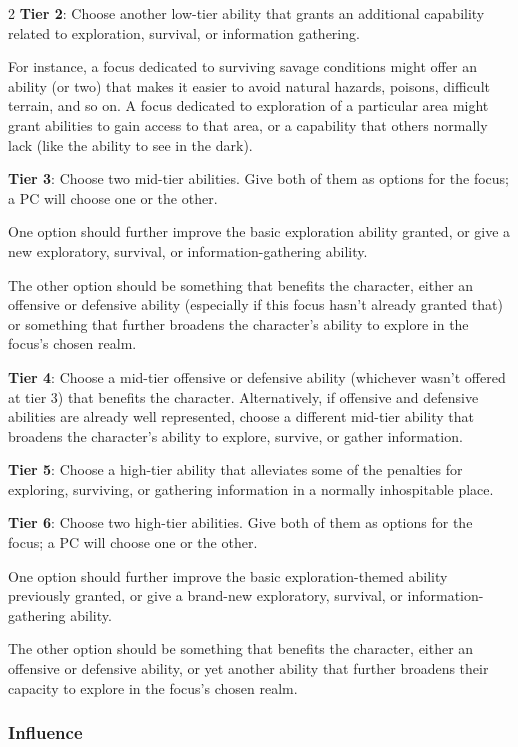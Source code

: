 \begin{multicols}{2}
\textbf{Tier 2}: Choose another low-tier ability that grants an additional capability related to exploration, survival, or information gathering.

For instance, a focus dedicated to surviving savage conditions might offer an ability (or two) that makes it easier to avoid natural hazards, poisons, difficult terrain, and so on. A focus dedicated to exploration of a particular area might grant abilities to gain access to that area, or a capability that others normally lack (like the ability to see in the dark).

\textbf{Tier 3}: Choose two mid-tier abilities. Give both of them as options for the focus; a PC will choose one or the other.

One option should further improve the basic exploration ability granted, or give a new exploratory, survival, or information-gathering ability.

The other option should be something that benefits the character, either an offensive or defensive ability (especially if this focus hasn’t already granted that) or something that further broadens the character’s ability to explore in the focus’s chosen realm. 

\textbf{Tier 4}: Choose a mid-tier offensive or defensive ability (whichever wasn’t offered at tier 3) that benefits the character. Alternatively, if offensive and defensive abilities are already well represented, choose a different mid-tier ability that broadens the character’s ability to explore, survive, or gather information.

\textbf{Tier 5}: Choose a high-tier ability that alleviates some of the penalties for exploring, surviving, or gathering information in a normally inhospitable place.

\textbf{Tier 6}: Choose two high-tier abilities. Give both of them as options for the focus; a PC will choose one or the other.

One option should further improve the basic exploration-themed ability previously granted, or give a brand-new exploratory, survival, or information-gathering ability.

The other option should be something that benefits the character, either an offensive or defensive ability, or yet another ability that further broadens their capacity to explore in the focus’s chosen realm. 

\subsubsection{Influence}


\end{multicols}
